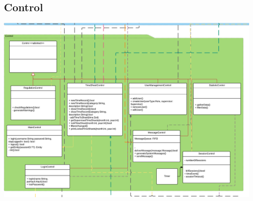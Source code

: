     \subsection{Control}
        \includegraphics[width=\linewidth]{"Diagramms/class/control.pdf"}\\
